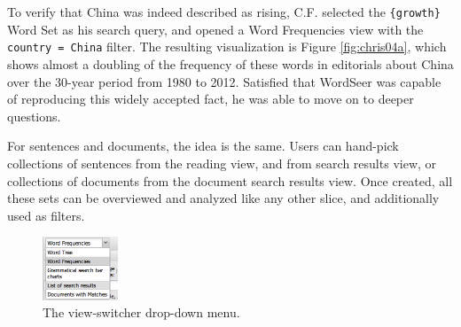 \documentclass{sig-alternate}
\newcommand{\code}[1] {\texttt{#1}}
\begin{document}
To verify that China was indeed described as rising, C.F. selected the  \code{\{growth\}} Word Set as his search query, and opened a Word Frequencies view with the  \code{ country = China} filter. The resulting visualization is Figure \ref{fig:chris04a}, which shows almost a doubling of the frequency of these words in editorials about China over the 30-year period from 1980 to 2012. Satisfied that WordSeer was capable of reproducing this widely accepted fact, he was able to move on to deeper questions.

For sentences and documents, the idea is the same.  Users can hand-pick collections of sentences from the reading view, and from search results view, or collections of documents from the document search results view.  Once created, all these sets can be overviewed and analyzed like any other slice, and additionally used as filters.


 

\newpage
\appendix
\begin{figure}[h!]
\begin{center}
\includegraphics[width=0.2\textwidth]{fig/chris/03.png}
\end{center}
\caption{ The view-switcher drop-down menu.\label{fig:chris03}}
\end{figure}
\end{document}
